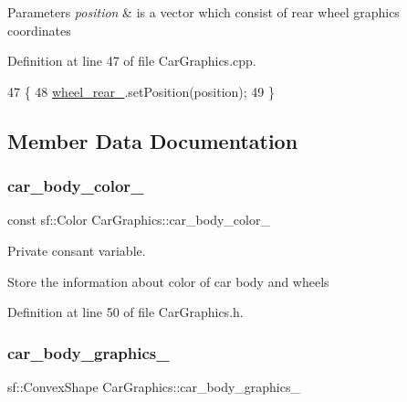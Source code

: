 \begin{DoxyParams}{Parameters}
{\em position} & is a vector which consist of rear wheel graphic\textquotesingle{}s coordinates \\
\hline
\end{DoxyParams}


Definition at line 47 of file Car\+Graphics.\+cpp.


\begin{DoxyCode}
47                                                                  \{
48     \hyperlink{classCarGraphics_a2a66d0c60b79f54a807a31afd76c4ad1}{wheel\_rear\_}.setPosition(position);
49 \}
\end{DoxyCode}


\subsection{Member Data Documentation}
\mbox{\label{classCarGraphics_a3df8d600a272817a5c521cdc8c23c587}} 
\subsubsection{\texorpdfstring{car\+\_\+body\+\_\+color\+\_\+}{car\_body\_color\_}}
{\footnotesize\ttfamily const sf\+::\+Color Car\+Graphics\+::car\+\_\+body\+\_\+color\+\_\+\hspace{0.3cm}{\ttfamily [private]}}



Private consant variable. 

Store the information about color of car body and wheels 

Definition at line 50 of file Car\+Graphics.\+h.

\mbox{\label{classCarGraphics_a4e1969ef5f4326f10b83b1488484f660}} 
\subsubsection{\texorpdfstring{car\+\_\+body\+\_\+graphics\+\_\+}{car\_body\_graphics\_}}
{\footnotesize\ttfamily sf\+::\+Convex\+Shape Car\+Graphics\+::car\+\_\+body\+\_\+graphics\+\_\+\hspace{0.3cm}{\ttfamily [private]}}



